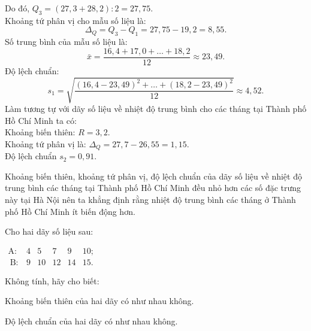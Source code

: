 \begin{bt}
{\begin{listEX}[1]
$$	$$
	Do đó, $Q_{3}=(27,3+28,2): 2=27,75$.\\
	Khoảng tứ phân vị cho mẫu số liệu là: $$\Delta_{Q}=Q_{3}-Q_{1}=27{,}75-19{,}2=8{,}55.$$
	Số trung bình của mẫu số liệu là: $$\bar{x}=\dfrac{16{,}4+17{,}0+\ldots+18{,}2}{12} \approx 23{,}49.$$
	Độ lệch chuẩn:
	$$
	s_{1}=\sqrt{\frac{(16{,}4-23{,}49)^{2}+\ldots+(18{,}2-23{,}49)^{2}}{12}} \approx 4{,}52.
	$$
	Làm tương tự với dãy số liệu về nhiệt độ trung bình cho các tháng tại Thành phố Hồ Chí Minh ta có:\\
	Khoảng biến thiên: $R=3,2$.\\
	Khoảng tứ phân vị là: $\Delta_{Q}=27,7-26,55=1,15$.\\
	Độ lệch chuẩn $s_{2}=0{,}91$.
	\item Khoảng biến thiên, khoảng tứ phân vị, độ lệch chuẩn của dãy số liệu về nhiệt độ trung bình các tháng tại Thành phố Hồ Chí Minh đều nhỏ hơn các số đặc trưng này tại Hà Nội nên ta khẳng định rằng nhiệt độ trung bình các tháng ở Thành phố Hồ Chí Minh ít biến động hơn.
\end{listEX}

}
\end{bt}

\begin{bt}%
	Cho hai dãy số liệu sau:
	\begin{center}
		$\begin{array}{rrrrrr}\mathrm{A}: & 4 & 5 & 7 & 9 & 10; \\ \mathrm{~B}: & 9 & 10 & 12 & 14 & 15 .\end{array}$
	\end{center}
	Không tính, hãy cho biết:
	\begin{listEX}[1]
		\item Khoảng biến thiên của hai dãy có như nhau không.
		\item Độ lệch chuẩn của hai dãy có như nhau không.
	\end{listEX}
\end{bt}


